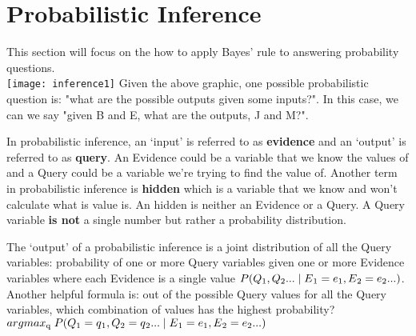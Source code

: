 \documentclass[12pt]{article}
\begin{document}
\section*{Probabilistic Inference}
\vspace{2em}
This section will focus on the how to apply Bayes' rule to answering probability questions.\\
\vspace{2em}
\texttt{[image: inference1]}
Given the above graphic, one possible probabilistic question is: "what are the possible outputs given some inputs?". In this case, we can we say "given B and E, what are the outputs, J and M?".\\
\par
In probabilistic inference, an \enquote*{input} is referred to as \textbf{evidence} and an \enquote*{output} is referred to as \textbf{query}. An Evidence could be a variable that we know the values of and a Query could be a variable we're trying to find the value of. Another term in probabilistic inference is \textbf{hidden} which is a variable that we know and won't calculate what is value is. An hidden is neither an Evidence or a Query. A Query variable \textbf{is not} a single number but rather a probability distribution. \\
\par
The \enquote*{output} of a probabilistic inference is a joint distribution of all the Query variables: probability of one or more Query variables given one or more Evidence variables where each Evidence is a single value \(P(Q\textsubscript{1}, Q\textsubscript{2} ... \mid E\textsubscript{1} = e\textsubscript{1}, E\textsubscript{2} = e\textsubscript{2} ... )\). Another helpful formula is: out of the possible Query values for all the Query variables, which combination of values has the highest probability? \(argmax\textsubscript{q}\;P(Q\textsubscript{1} = q\textsubscript{1}, Q\textsubscript{2} = q\textsubscript{2} ... \mid E\textsubscript{1} = e\textsubscript{1}, E\textsubscript{2} = e\textsubscript{2} ... )\)\\
\end{document}
